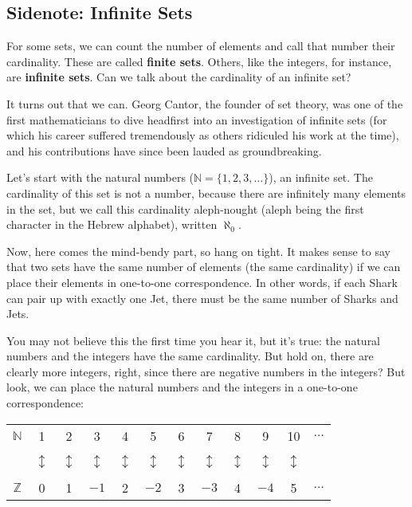 \subsection{Sidenote: Infinite Sets}
For some sets, we can count the number of elements and call that number their cardinality.  These are called \textbf{finite sets}.  Others, like the integers, for instance, are \textbf{infinite sets}.  Can we talk about the cardinality of an infinite set?

It turns out that we can.  Georg Cantor, the founder of set theory, was one of the first mathematicians to dive headfirst into an investigation of infinite sets (for which his career suffered tremendously as others ridiculed his work at the time), and his contributions have since been lauded as groundbreaking.

Let's start with the natural numbers ($\mathbb{N} = \{1,2,3,\ldots\}$), an infinite set.  The cardinality of this set is not a number, because there are infinitely many elements in the set, but we call this cardinality aleph-nought (aleph being the first character in the Hebrew alphabet), written $\aleph_0$.

Now, here comes the mind-bendy part, so hang on tight.  It makes sense to say that two sets have the same number of elements (the same cardinality) if we can place their elements in one-to-one correspondence.  In other words, if each Shark can pair up with exactly one Jet, there must be the same number of Sharks and Jets.
\pagebreak

You may not believe this the first time you hear it, but it's true: the natural numbers and the integers have the same cardinality.  But hold on, there are clearly more integers, right, since there are negative numbers in the integers?  But look, we can place the natural numbers and the integers in a one-to-one correspondence:
\begin{center}
\begin{tabular}{c | c c c c c c c c c c c}
$\mathbb{N}$ & 1 & 2 & 3 & 4 & 5 & 6 & 7 & 8 & 9 & 10 & $\ldots$\\
& & & & & & & & & & & \\
& $\updownarrow$ & $\updownarrow$ & $\updownarrow$ & $\updownarrow$ & $\updownarrow$ & $\updownarrow$ & $\updownarrow$ & $\updownarrow$ & $\updownarrow$ & $\updownarrow$ & \\
& & & & & & & & & & & \\
$\mathbb{Z}$ & 0 & 1 & $-1$ & 2 & $-2$ & 3 & $-3$ & 4 & $-4$ & 5 & $\ldots$
\end{tabular}
\end{center}

